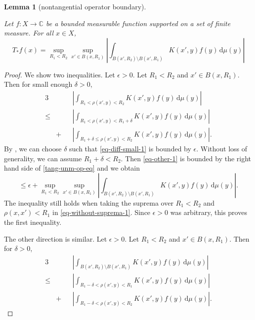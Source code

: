 \documentclass[10pt,a4paper]{article}
\theoremstyle{plain}
\newtheorem{lemma}[theorem]{Lemma}
\theoremstyle{definition}
\numberwithin{equation}{subsection}
\newcommand{\lean}[1]{}
\newcommand{\uses}[1]{}
\newcommand{\leanok}{}
\def\C{\mathbb{C}}
\begin{document}
\begin{lemma}[nontangential operator boundary]
    \label{nontangential-operator-boundary}
    \leanok
    \lean{nontangential_operator_boundary}
    \uses{small-annulus}
    Let $f:X\to\C$ be a bounded measurable function supported on a set of finite measure.
    For all $x\in X$,
    \begin{equation}
    \label{tang-unm-op-eq}
        T_*f(x) = \sup_{R_1 < R_2} \sup_{x'\in B(x,R_1)} \left|\int_{B(x',R_2)\setminus B(x',R_1)} K(x',y) f(y) \, \mathrm{d}\mu(y) \right|
    \end{equation}
\end{lemma}
\begin{proof}
\leanok
We show two inequalities. Let $\epsilon>0$.
Let $R_1<R_2$ and $x'\in B(x,R_1)$. Then for small enough $\delta>0$,
\begin{alignat}{3}
    \label{eq-without-suprema-1}
    &&&\left|\int_{R_1<\rho(x',y)<R_2} K(x',y) f(y) \, \mathrm{d}\mu(y) \right| \\
    \label{eq-diff-small-1}
    \le &&&\left|\int_{R_1<\rho(x',y)<R_1+\delta} K(x',y) f(y) \, \mathrm{d}\mu(y) \right| \\
    \label{eq-other-1}
    &+&&\left|\int_{R_1+\delta\le\rho(x',y)<R_2} K(x',y) f(y) \, \mathrm{d}\mu(y) \right| .
\end{alignat}
By , we can choose $\delta$ such that \eqref{eq-diff-small-1} is bounded by $\epsilon$. Without loss of generality, we can assume $R_1+\delta<R_2$. Then \eqref{eq-other-1} is bounded by the right hand side of \eqref{tang-unm-op-eq} and we obtain
\begin{equation*}
    \le \epsilon + \sup_{R_1 < R_2} \sup_{x'\in B(x,R_1)} \left|\int_{B(x',R_2)\setminus B(x',R_1)} K(x',y) f(y) \, \mathrm{d}\mu(y) \right| .
\end{equation*}
The inequality still holds when taking the suprema over $R_1<R_2$ and $\rho(x,x')<R_1$ in \eqref{eq-without-suprema-1}. Since $\epsilon>0$ was arbitrary, this proves the first inequality.

The other direction is similar. Let $\epsilon>0$.
Let $R_1<R_2$ and $x'\in B(x,R_1)$. Then for $\delta>0$,
\begin{alignat}{3}
    \label{eq-without-suprema-2}
    &&&\left|\int_{B(x',R_2)\setminus B(x',R_1)} K(x',y) f(y) \, \mathrm{d}\mu(y) \right| \\
    \label{eq-diff-small-2}
    \le &&&\left|\int_{R_1-\delta<\rho(x',y)< R_1} K(x',y) f(y) \, \mathrm{d}\mu(y) \right| \\
    \label{eq-other-2}
    &+&&\left|\int_{R_1-\delta<\rho(x',y)<R_2} K(x',y) f(y) \, \mathrm{d}\mu(y) \right| .
\end{alignat}


\end{proof}
\end{document}
